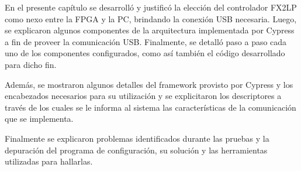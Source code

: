 En el presente capítulo se desarrolló y justificó la elección del controlador FX2LP como nexo entre la FPGA y la PC, brindando la conexión USB necesaria. Luego, se explicaron algunos componentes de la arquitectura implementada por Cypress a fin de proveer la comunicación USB. Finalmente, se detalló paso a paso cada uno de los componentes configurados, como así también el código desarrollado para dicho fin.

Además, se mostraron algunos detalles del framework provisto por Cypress y los encabezados necesarios para su utilización y se explicitaron los descriptores a través de los cuales se le informa al sistema las características de la comunicación que se implementa.

Finalmente se explicaron problemas identificados durante las pruebas y la depuración del programa de configuración, su solución y las herramientas utilizadas para hallarlas.